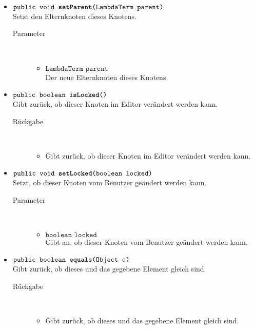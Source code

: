 \begin{description}
\begin{itemize}
		\item $\texttt{public void \textbf{setParent}(LambdaTerm parent)}$ \\ Setzt den Elternknoten dieses Knotens.
		\begin{description}
			\item[Parameter] \hfill \\
			\vspace{-.8cm}
			\begin{itemize}
				\item $\texttt{LambdaTerm parent}$ \\ Der neue Elternknoten dieses Knotens.
			\end{itemize}
		\end{description}
		
		\item $\texttt{public boolean \textbf{isLocked}()}$ \\ Gibt zurück, ob dieser Knoten im Editor verändert werden kann.
		\begin{description}
			\item[Rückgabe] \hfill \\
			\vspace{-.8cm}
			\begin{itemize}
				\item Gibt zurück, ob dieser Knoten im Editor verändert werden kann.
			\end{itemize}
		\end{description}
		
		\item $\texttt{public void \textbf{setLocked}(boolean locked)}$ \\ Setzt, ob dieser Knoten vom Benutzer geändert werden kann.
		\begin{description}
			\item[Parameter] \hfill \\
			\vspace{-.8cm}
			\begin{itemize}
				\item $\texttt{boolean locked}$ \\ Gibt an, ob dieser Knoten vom Benutzer geändert werden kann.
			\end{itemize}
		\end{description}
		
		\item $\texttt{public boolean \textbf{equals}(Object o)}$ \\ Gibt zurück, ob dieses und das gegebene Element gleich sind.
		\begin{description}
			\item[Rückgabe] \hfill \\
			\vspace{-.8cm}
			\begin{itemize}
				\item Gibt zurück, ob dieses und das gegebene Element gleich sind.
			\end{itemize}
		\end{description}
	\end{itemize}
\end{description}

